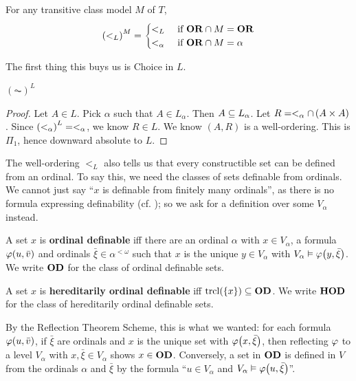 For any transitive class model $M$ of $T$,
\begin{align*}
    \left( <_L \right)^M
    = \begin{cases}
        <_L & \text{ if } \mathbf{OR} \cap M = \mathbf{OR} \\
        <_{\alpha} & \text{ if } \mathbf{OR} \cap M = \alpha
    \end{cases}
\end{align*}

The first thing this buys us is Choice in $L$.

\begin{boxtheorem}[using $\ZF$ in $V$] \label{Ch4:Thm:AC_In_L}
    $(\AC)^L$
\end{boxtheorem}
\begin{proof}
    Let $A \in L$. Pick $\alpha$ such that $A \in L_{\alpha}$. Then $A \subseteq L_{\alpha}$. Let $R = <_{\alpha} \cap \left( A \times A \right)$. Since $\left( <_{\alpha} \right)^L = <_{\alpha}$, we know $R \in L$. We know $(A, R)$ is a well-ordering. This is $\Pi_1$, hence downward absolute to $L$.
\end{proof}

The well-ordering $<_L$ also tells us that every constructible set can be defined from an ordinal. To say this, we need the classes of sets definable from ordinals. We cannot just say ``$x$ is definable from finitely many ordinals'', as there is no formula expressing definability (cf. ); so we ask for a definition over some $V_{\alpha}$ instead.

\begin{boxdefinition}
    A set $x$ is \textbf{ordinal definable} iff there are an ordinal $\alpha$ with $x \in V_{\alpha}$, a formula $\varphi\!\left( u, \bar{v} \right)$ and ordinals $\bar{\xi} \in \alpha^{<\omega}$ such that $x$ is the unique $y \in V_{\alpha}$ with $V_{\alpha} \vDash \varphi\!\left( y, \bar{\xi} \right)$. We write $\mathbf{OD}$ for the class of ordinal definable sets.

    A set $x$ is \textbf{hereditarily ordinal definable} iff $\operatorname{trcl}\!\left( \left\{ x \right\} \right) \subseteq \mathbf{OD}$. We write $\mathbf{HOD}$ for the class of hereditarily ordinal definable sets.
\end{boxdefinition}

By the Reflection Theorem Scheme, this is what we wanted: for each formula $\varphi\!\left( u, \bar{v} \right)$, if $\bar{\xi}$ are ordinals and $x$ is the unique set with $\varphi\!\left( x, \bar{\xi} \right)$, then reflecting $\varphi$ to a level $V_{\alpha}$ with $x, \bar{\xi} \in V_{\alpha}$ shows $x \in \mathbf{OD}$. Conversely, a set in $\mathbf{OD}$ is defined in $V$ from the ordinals $\alpha$ and $\bar{\xi}$ by the formula ``$u \in V_{\alpha}$ and $V_{\alpha} \vDash \varphi\!\left( u, \bar{\xi} \right)$''.

